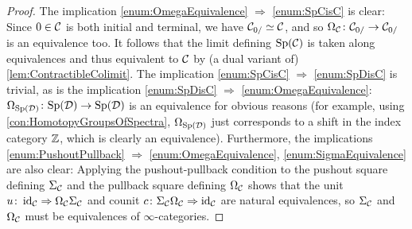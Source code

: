 \begin{proof}%
	The implication \cref{enum:OmegaEquivalence} $\Rightarrow$ \cref{enum:SpCisC} is clear: Since $0\in\mathcal{C}$ is both initial and terminal, we have $\mathcal{C}_{0/}\simeq \mathcal{C}$, and so $\Omega_{\mathcal{C}}\colon \mathcal{C}_{0/}\rightarrow \mathcal{C}_{0/}$ is an equivalence too. It follows that the limit defining $\mathrm{Sp}(\mathcal{C})$ is taken along equivalences and thus equivalent to $\mathcal{C}$ by (a dual variant of) \cref{lem:ContractibleColimit}. The implication \cref{enum:SpCisC} $\Rightarrow$ \cref{enum:SpDisC} is trivial, as is the implication \cref{enum:SpDisC} $\Rightarrow$ \cref{enum:OmegaEquivalence}: $\Omega_{\mathrm{Sp}(\mathcal{D})}\colon \mathrm{Sp}(\mathcal{D})\rightarrow \mathrm{Sp}(\mathcal{D})$ is an equivalence for obvious reasons (for example, using \cref{con:HomotopyGroupsOfSpectra}, $\Omega_{\mathrm{Sp}(\mathcal{D})}$ just corresponds to a shift in the index category $\mathbb{Z}$, which is clearly an equivalence). Furthermore, the implications \cref{enum:PushoutPullback} $\Rightarrow $ \cref{enum:OmegaEquivalence}, \cref{enum:SigmaEquivalence} are also clear: Applying the pushout-pullback condition to the pushout square defining $\Sigma_{\mathcal{C}}$ and the pullback square defining $\Omega_{\mathcal{C}}$ shows that the unit $u\colon\operatorname{id}_{\mathcal{C}}\Rightarrow\Omega_{\mathcal{C}}\Sigma_{\mathcal{C}}$ and counit $c\colon \Sigma_{\mathcal{C}}\Omega_{\mathcal{C}}\Rightarrow\operatorname{id}_{\mathcal{C}}$ are natural equivalences, so $\Sigma_{\mathcal{C}}$ and $\Omega_{\mathcal{C}}$ must be equivalences of $\infty$-categories.
	

\end{proof}
